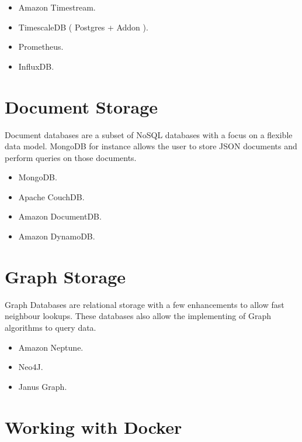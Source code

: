 \documentclass{csse4400}
\begin{document}
\begin{itemize}
  \item Amazon Timestream.
  \item TimescaleDB ( Postgres + Addon ).
  \item Prometheus.
  \item InfluxDB.
\end{itemize}

\section{Document Storage}

Document databases are a subset of NoSQL databases with a focus on a flexible data model. MongoDB for instance 
allows the user to store JSON documents and perform queries on those documents.

\begin{itemize}
  \item MongoDB.
  \item Apache CouchDB.
  \item Amazon DocumentDB.
  \item Amazon DynamoDB.
\end{itemize}

\section{Graph Storage}


Graph Databases are relational storage with a few enhancements to allow fast neighbour lookups. These databases also
allow the implementing of Graph algorithms to query data.

\begin{itemize}
  \item Amazon Neptune.
  \item Neo4J.
  \item Janus Graph.
\end{itemize}

\section{Working with Docker}
\end{document}
